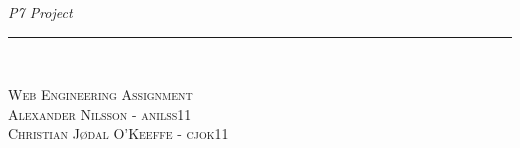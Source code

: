 \thispagestyle{empty}
\begin{flushright}
\vspace{3cm}

\phantom{hul}

\phantom{hul}

\phantom{hul}

\textsl{P7 Project} \\ \vspace{1cm}

\rule{0.8\textwidth}{3mm} \\ \vspace{1.5cm}


\vspace{1.5cm} 
\textsc{\Large Web Engineering Assignment\\
Alexander Nilsson - anilss11\\
Christian Jødal O'Keeffe - cjok11\\
~\\
}
\end{flushright}
